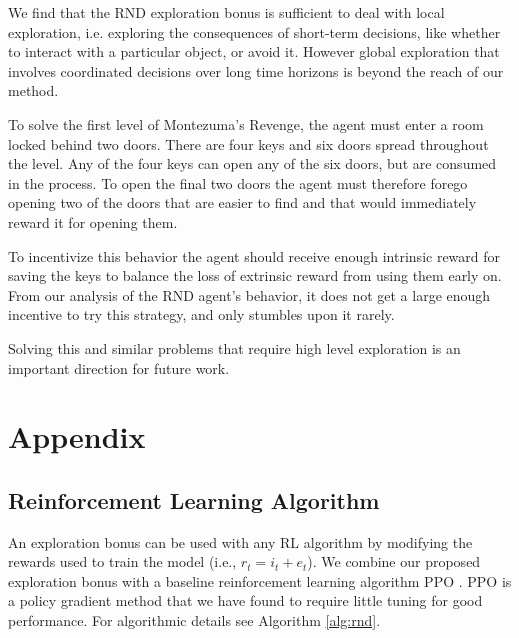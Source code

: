 \documentclass{article} \usepackage[dvipsnames]{xcolor}
\begin{document}
We find that the RND exploration bonus is sufficient to deal with local exploration, i.e. exploring the consequences of short-term decisions, like whether to interact with a particular object, or avoid it. However global exploration that involves coordinated decisions over long time horizons is  beyond the reach of our method.

To solve the first level of Montezuma's Revenge, the agent must enter a room locked behind two doors. There are four keys and six doors spread throughout the level. Any of the four keys can open any of the six doors, but are consumed in the process. To open the final two doors the agent must therefore forego opening two of the doors that are easier to find and that would immediately reward it for opening them.

To incentivize this behavior the agent should receive enough intrinsic reward for saving the keys to balance the loss of extrinsic reward from using them early on. From our analysis of the RND agent's behavior, it does not get a large enough incentive to try this strategy, and only stumbles upon it rarely.

Solving this and similar problems that require high level exploration is an important direction for future work.




\appendix
\section{Appendix}
\subsection{Reinforcement Learning Algorithm}
An exploration bonus can be used with any RL algorithm by modifying the rewards used to train the model (i.e., $r_t = i_t + e_t$). We combine our proposed exploration bonus with a baseline reinforcement learning algorithm PPO \citep{ppo}. PPO is a policy gradient method that we have found to require little tuning for good performance. For algorithmic details see Algorithm \ref{alg:rnd}.
\end{document}
